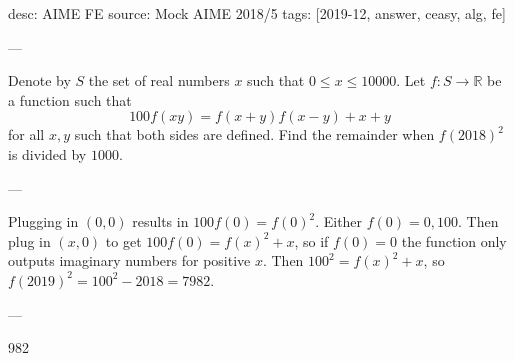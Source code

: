 desc: AIME FE
source: Mock AIME 2018/5
tags: [2019-12, answer, ceasy, alg, fe]

---

Denote by $S$ the set of real numbers $x$ such that $0\le x\le 10000$. Let $f:S\to\mathbb{R}$ be a function such that $$100f(xy) = f(x+y)f(x-y)+x+y$$ for all $x,y$ such that both sides are defined. Find the remainder when $f(2018)^2$ is divided by $1000$.

---

Plugging in $(0,0)$ results in $100f(0) = f(0)^2$. Either $f(0) = 0,100$. Then plug in $(x,0)$ to get $100f(0) = f(x)^2+x$, so if $f(0) = 0$ the function only outputs imaginary numbers for positive $x$. Then $100^2 = f(x)^2+x$, so $f(2019)^2 = 100^2-2018 = 7982$.

---

982
